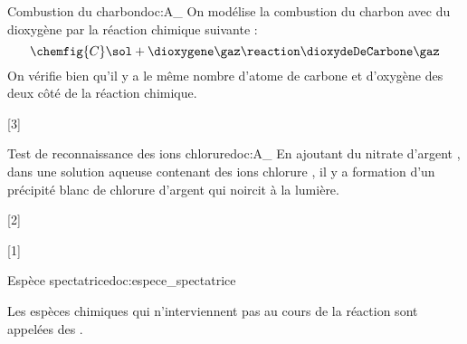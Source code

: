 \begin{doc}{Combustion du charbon}{doc:A_}
  On modélise la combustion du charbon avec du dioxygène par la réaction chimique suivante :
  \begin{equation*}
    \chemfig{C}\sol + \dioxygene\gaz \reaction \dioxydeDeCarbone\gaz
  \end{equation*}
  On vérifie bien qu'il y a le même nombre d'atome de carbone et d'oxygène des deux côté de la réaction chimique.
\end{doc}


[3]



\begin{doc}{Test de reconnaissance des ions chlorure}{doc:A_}
  En ajoutant du nitrate d'argent \sol, dans une solution aqueuse contenant des ions chlorure \chlorure, il y a formation d'un précipité blanc de chlorure d'argent \chlorureDArgent\sol qui noircit à la lumière.
\end{doc}

[2]

[1]

\vspace*{-4pt}
\begin{doc}{Espèce spectatrice}{doc:espece_spectatrice}
  \begin{importants}
    Les espèces chimiques qui n'interviennent pas au cours de la réaction sont appelées des .
  \end{importants}
\end{doc}
